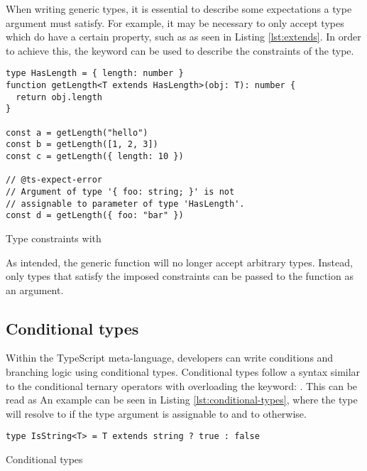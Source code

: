 When writing generic types, it is essential to describe some expectations a type argument must satisfy. For example, it may be necessary to only accept types which do have a certain property, such as  as seen in Listing \ref{lst:extends}. In order to achieve this, the  keyword can be used to describe the constraints of the type.

\begin{listing}[ht]
  \begin{verbatim}
type HasLength = { length: number }
function getLength<T extends HasLength>(obj: T): number {
  return obj.length
}

const a = getLength("hello")
const b = getLength([1, 2, 3])
const c = getLength({ length: 10 })

// @ts-expect-error 
// Argument of type '{ foo: string; }' is not 
// assignable to parameter of type 'HasLength'.
const d = getLength({ foo: "bar" })
\end{verbatim}
  \caption{Type constraints with }\label{lst:extends}
\end{listing}

As intended, the generic  function will no longer accept arbitrary types. Instead, only types that satisfy the imposed constraints can be passed to the function as an argument.

\clearpage

\subsection{Conditional types}\label{sec:conditional-types}

Within the TypeScript meta-language, developers can write conditions and branching logic using conditional types. Conditional types follow a syntax similar to the conditional ternary operators with overloading the  keyword: . This can be read as  An example can be seen in Listing \ref{lst:conditional-types}, where the  type will resolve to  if the type argument  is assignable to  and to  otherwise.

\begin{listing}[ht]
  \begin{verbatim}
type IsString<T> = T extends string ? true : false
\end{verbatim}
  \caption{Conditional types}\label{lst:conditional-types}
\end{listing}

